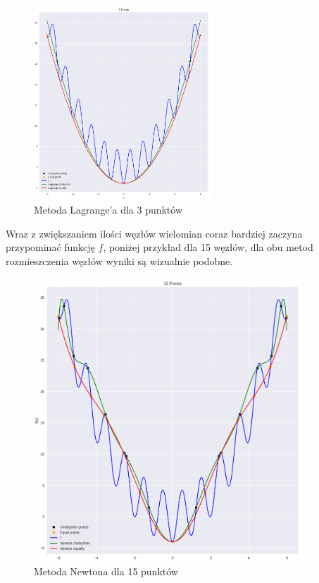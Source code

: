\documentclass{article}
\begin{document}
\begin{figure}[H]
    \centering
    \includegraphics[width=0.6\textwidth]{img/lagr_3.png}
    \caption{Metoda Lagrange'a dla 3 punktów}
\end{figure}

Wraz z zwiększaniem ilości węzłów wielomian coraz bardziej zaczyna przypominać funkcję $f$, 
poniżej przykład dla 15 węzłów, dla obu metod rozmieszczenia węzłów wyniki są wizualnie podobne.

\begin{figure}[H]
    \centering
    \includegraphics[width=0.9\textwidth]{img/newt_15.png}
    \caption{Metoda Newtona dla 15 punktów}
\end{figure}
\end{document}
